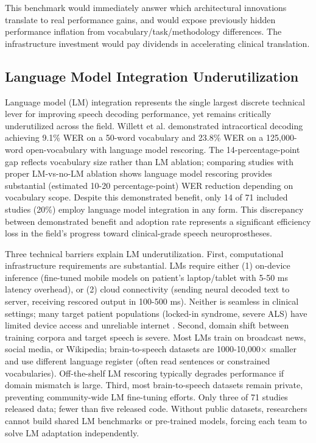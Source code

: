 This benchmark would immediately answer which architectural innovations translate to real performance gains, and would expose previously hidden performance inflation from vocabulary/task/methodology differences. The infrastructure investment would pay dividends in accelerating clinical translation.

\subsection{Language Model Integration Underutilization}
\label{sec:lm_underutil}

Language model (LM) integration represents the single largest discrete technical lever for improving speech decoding performance, yet remains critically underutilized across the field. Willett et al. \cite{Willett2023} demonstrated intracortical decoding achieving 9.1\% WER on a 50-word vocabulary and 23.8\% WER on a 125,000-word open-vocabulary with language model rescoring. The 14-percentage-point gap reflects vocabulary size rather than LM ablation; comparing studies with proper LM-vs-no-LM ablation shows language model rescoring provides substantial (estimated 10-20 percentage-point) WER reduction depending on vocabulary scope. Despite this demonstrated benefit, only 14 of 71 included studies (20\%) employ language model integration in any form. This discrepancy between demonstrated benefit and adoption rate represents a significant efficiency loss in the field's progress toward clinical-grade speech neuroprostheses.

Three technical barriers explain LM underutilization. First, computational infrastructure requirements are substantial. LMs require either (1) on-device inference (fine-tuned mobile models on patient's laptop/tablet with 5-50 ms latency overhead), or (2) cloud connectivity (sending neural decoded text to server, receiving rescored output in 100-500 ms). Neither is seamless in clinical settings; many target patient populations (locked-in syndrome, severe ALS) have limited device access and unreliable internet \cite{Vansteensel2023}. Second, domain shift between training corpora and target speech is severe. Most LMs train on broadcast news, social media, or Wikipedia; brain-to-speech datasets are 1000-10,000$\times$ smaller and use different language register (often read sentences or constrained vocabularies). Off-the-shelf LM rescoring typically degrades performance if domain mismatch is large. Third, most brain-to-speech datasets remain private, preventing community-wide LM fine-tuning efforts. Only three of 71 studies released data; fewer than five released code. Without public datasets, researchers cannot build shared LM benchmarks or pre-trained models, forcing each team to solve LM adaptation independently.

